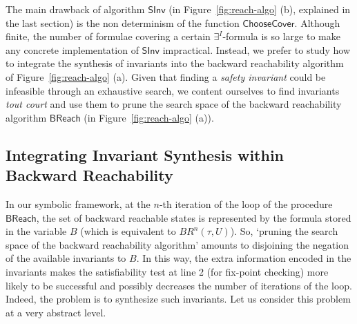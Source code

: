 \documentclass{LMCS}
\theoremstyle{plain}\newtheorem{assumption}[thm]{Assumption}
\theoremstyle{plain}\newtheorem{proposition}[thm]{Proposition}
\theoremstyle{plain}\newtheorem{property}[thm]{Property}
\theoremstyle{plain}\newtheorem{example}[thm]{Example}
\theoremstyle{plain}\newtheorem{claim}[thm]{Claim}
\theoremstyle{plain}\newtheorem{lemma}[thm]{Lemma}
\begin{document}
The main drawback of algorithm $\mathsf{SInv}$ (in
Figure~\ref{fig:reach-algo} (b), explained in the last section) is the
non determinism of the function $\mathsf{ChooseCover}$.  Although
finite, the number of formulae covering a certain $\exists^I$-formula
is so large to make any concrete implementation of $\mathsf{SInv}$
impractical.  Instead, we prefer to study how to integrate the
synthesis of invariants into the backward reachability algorithm of
Figure~\ref{fig:reach-algo} (a). Given that finding a \emph{safety
  invariant} could be infeasible through an exhaustive search, we
content ourselves to find invariants \emph{tout court} and use them to
prune the search space of the backward reachability algorithm
$\mathsf{BReach}$ (in Figure~\ref{fig:reach-algo} (a)).

\subsection{Integrating Invariant Synthesis within Backward
  Reachability}
\label{sec:back+inv}

In our symbolic framework, at the $n$-th iteration of the loop of the
procedure $\mathsf{BReach}$, the set of backward reachable states is
represented by the formula stored in the variable $B$ (which is
equivalent to $BR^n(\tau,U)$).  So, `pruning the search space of the
backward reachability algorithm' amounts to disjoining the negation of
the available invariants to $B$.  In this way, the extra information
encoded in the invariants makes the satisfiability test at line 2 (for
fix-point checking) more likely to be successful and possibly
decreases the number of iterations of the loop.  Indeed, the problem
is to synthesize such invariants. Let us consider
this problem at a very abstract level.
\end{document}
